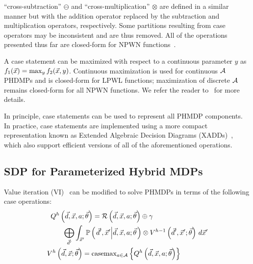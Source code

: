 \documentclass[letterpaper]{article}
\begin{document}
``cross-subtraction'' {\footnotesize$\ominus$} and ``cross-multiplication'' {\footnotesize$\otimes$} are defined in a similar manner but with the addition operator replaced by the subtraction and multiplication operators, respectively. Some partitions resulting from case operators may be inconsistent and are thus removed. All of the operations presented thus far are closed-form for NPWN functions~\cite{Sanner_UAI_2011}.

A case statement can be maximized with respect to a continuous parameter {\footnotesize$y$} as {\footnotesize $ f_1(\vec{x}) = \contmax_{y}f_2(\vec{x}, y) $}. Continuous maximization is used for continuous {\footnotesize $\mathcal{A}$} PHDMPs and is closed-form for LPWL functions; maximization of discrete {\footnotesize $\mathcal{A}$} remains closed-form for all NPWN functions. We refer the reader to~\cite{Sanner_UAI_2011,Zamani_AAAI_2012} for more details. %

In principle, case statements can be used to represent all PHMDP components. In practice, case statements are implemented using a more compact representation known as Extended Algebraic Decision Diagrams (XADDs)~\cite{Sanner_UAI_2011}, which also support efficient versions of all of the aforementioned operations. 

\subsection{SDP for Parameterized Hybrid MDPs}

Value iteration (VI)~\cite{Bellman_PU_1957} can be modified to solve PHMDPs in terms of the following case operations:
{\footnotesize 
    \begin{align}
    Q^{h} \left( \vec{d}, \vec{x}, a; \vec{\theta} \right) = \mathcal{R} \left( \vec{d}, \vec{x}, a; \vec{\theta} \right) \oplus \gamma \qquad \qquad \qquad \qquad &  \nonumber \\ 
    \bigoplus_{\vec{d}'} \int_{\vec{x}'} \mathbb{P}\left({ \left. \vec{d}', \vec{x}' \middle| \vec{d}, \vec{x}, a; \vec{\theta} \right.}\right) \otimes V^{h-1} \left( \vec{d}', \vec{x}'; \vec{\theta} \right) \, d\vec{x}' & \label{eq:vi_sdp_qfunc} \\
    V^{h}\left( \vec{d}, \vec{x}; \vec{\theta} \right) = \mathrm{casemax}_{a \in \mathcal{A}} \left\{ Q^{h} \left( \vec{d}, \vec{x}, a; \vec{\theta} \right) \right\} \qquad \qquad & \label{eq:vi_sdp_vfunc}
    \end{align}
}%
\end{document}
